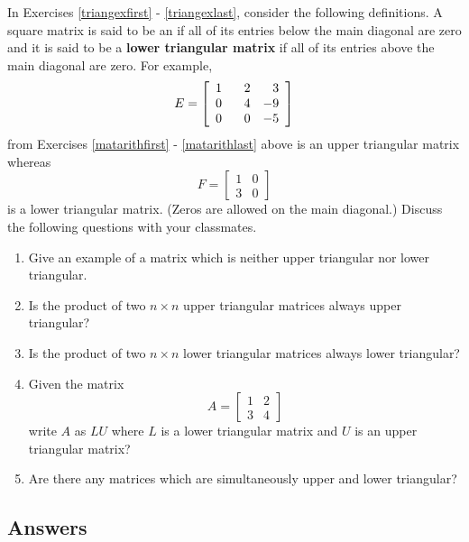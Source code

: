 \label{triangularmatrices}

In Exercises \ref{triangexfirst} - \ref{triangexlast}, consider the following definitions. A square matrix is said to be an  if all of its entries below the main diagonal are zero and it is said to be a {\bf lower triangular matrix} if all of its entries above the main diagonal are zero. For example, \[E = \left[ \begin{array}{rrr} 1 & \hphantom{-}2 & 3 \\ 0 & 4 & -9 \\ 0 & 0 & -5 \end{array} \right]\] from Exercises \ref{matarithfirst} - \ref{matarithlast} above is an upper triangular matrix whereas \[F = \left[ \begin{array}{rr} 1 & 0 \\ 3 & 0 \end{array} \right]\] is a lower triangular matrix.  (Zeros are allowed on the main diagonal.)  Discuss the following questions with your classmates.

\begin{enumerate}
\setcounter{enumi}{\value{HW}}

\item Give an example of a matrix which is neither upper triangular nor lower triangular. \label{triangexfirst} 
\item Is the product of two $n \times n$ upper triangular matrices always upper triangular?
\item Is the product of two $n \times n$ lower triangular matrices always lower triangular?
\item Given the matrix \[A = \left[ \begin{array}{rr} 1 & 2 \\ 3 & 4 \end{array} \right]\] write $A$ as $LU$ where $L$ is a lower triangular matrix and $U$ is an upper triangular matrix?
\item Are there any matrices which are simultaneously upper and lower triangular? \label{triangexlast}

\setcounter{HW}{\value{enumi}}
\end{enumerate}


\newpage

\subsection{Answers}

